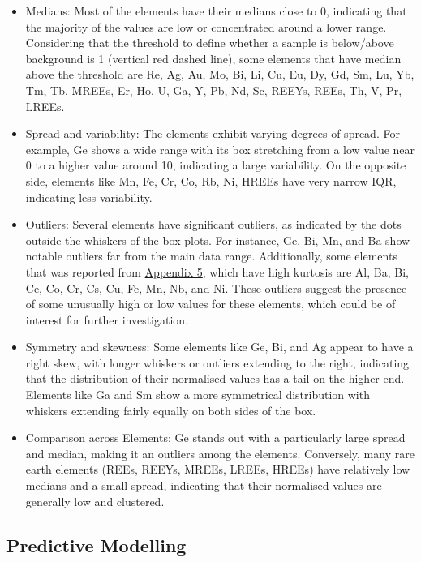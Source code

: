 \documentclass[11pt,a4paper,]{article}
\providecommand{\tightlist}{%
  \setlength{\itemsep}{0pt}\setlength{\parskip}{0pt}}
\begin{document}
\begin{itemize}
\tightlist
\item
  Medians: Most of the elements have their medians close to 0, indicating that the majority of the values are low or concentrated around a lower range. Considering that the threshold to define whether a sample is below/above background is 1 (vertical red dashed line), some elements that have median above the threshold are Re, Ag, Au, Mo, Bi, Li, Cu, Eu, Dy, Gd, Sm, Lu, Yb, Tm, Tb, MREEs, Er, Ho, U, Ga, Y, Pb, Nd, Sc, REEYs, REEs, Th, V, Pr, LREEs.
\item
  Spread and variability: The elements exhibit varying degrees of spread. For example, Ge shows a wide range with its box stretching from a low value near 0 to a higher value around 10, indicating a large variability. On the opposite side, elements like Mn, Fe, Cr, Co, Rb, Ni, HREEs have very narrow IQR, indicating less variability.
\item
  Outliers: Several elements have significant outliers, as indicated by the dots outside the whiskers of the box plots. For instance, Ge, Bi, Mn, and Ba show notable outliers far from the main data range. Additionally, some elements that was reported from \hyperref[sec-appendixfive]{Appendix 5}, which have high kurtosis are Al, Ba, Bi, Ce, Co, Cr, Cs, Cu, Fe, Mn, Nb, and Ni. These outliers suggest the presence of some unusually high or low values for these elements, which could be of interest for further investigation.
\item
  Symmetry and skewness: Some elements like Ge, Bi, and Ag appear to have a right skew, with longer whiskers or outliers extending to the right, indicating that the distribution of their normalised values has a tail on the higher end. Elements like Ga and Sm show a more symmetrical distribution with whiskers extending fairly equally on both sides of the box.
\item
  Comparison across Elements: Ge stands out with a particularly large spread and median, making it an outliers among the elements. Conversely, many rare earth elements (REEs, REEYs, MREEs, LREEs, HREEs) have relatively low medians and a small spread, indicating that their normalised values are generally low and clustered.
\end{itemize}

\subsection{Predictive Modelling}\label{predictive-modelling}
\end{document}
